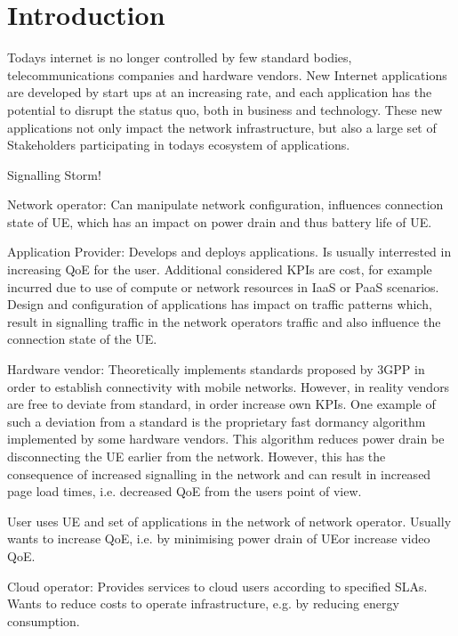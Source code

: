 \chapter{Introduction}\label{chap:introduction}

Todays internet is no longer controlled by few standard bodies, telecommunications companies and hardware vendors. 
New Internet applications are developed by start ups at an increasing rate, and each application has the potential to disrupt the status quo, both in business and technology.
These new applications not only impact the network infrastructure, but also a large set of Stakeholders participating in todays ecosystem of applications.

Signalling Storm!


Network operator: Can manipulate network configuration, influences connection state of UE, which has an impact on power drain and thus battery life of UE.

Application Provider: Develops and deploys applications. Is usually interrested in increasing \gls{QoE} for the user. Additional considered \glspl{KPI} are cost, for example incurred due to use of compute or network resources in \gls{IaaS} or \gls{PaaS} scenarios. Design and configuration of applications has impact on traffic patterns which, result in signalling traffic in the network operators traffic and also influence the connection state of the UE.

Hardware vendor: Theoretically implements standards proposed by \gls{3GPP} in order to establish connectivity with mobile networks. However, in reality vendors are free to deviate from standard, in order increase own \glspl{KPI}. One example of such a deviation from a standard is the proprietary fast dormancy algorithm implemented by some hardware vendors. This algorithm reduces power drain be disconnecting the \gls{UE} earlier from the network. However, this has the consequence of increased signalling in the network and can result in increased page load times, i.e. decreased \gls{QoE} from the users point of view.

User uses \gls{UE} and set of applications in the network of network operator. 
Usually wants to increase \gls{QoE}, i.e. by minimising power drain of \gls{UE}or increase video \gls{QoE}.

Cloud operator: Provides services to cloud users according to specified \glspl{SLA}. Wants to reduce costs to operate infrastructure, e.g. by reducing energy consumption.

